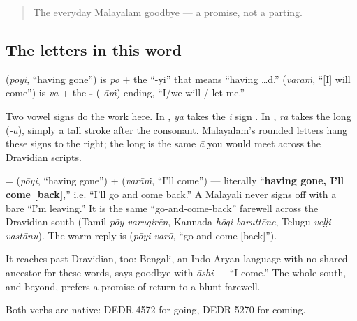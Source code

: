 \label{lesson:ML-C04-poyi-varaam}



\begin{quote}
The everyday Malayalam goodbye — a promise, not a parting.
\end{quote}

\subsection*{The letters in this word}
\textbf{} (\emph{pōyi}, \textquotedblleft{}having gone\textquotedblright{}) is \emph{pō} + the \textquotedblleft{}-yi\textquotedblright{} that means \textquotedblleft{}having …d.\textquotedblright{} \textbf{} (\emph{varāṁ}, \textquotedblleft{}{[}I{]} will come\textquotedblright{}) is \emph{va} + the \textbf{-} (\emph{-āṁ}) ending, \textquotedblleft{}I/we will / let me.\textquotedblright{}

Two vowel signs do the work here. In \textbf{}, \emph{ya} takes the \emph{i} sign \textbf{}. In \textbf{}, \emph{ra} takes the long \textbf{} (\emph{-ā}), simply a tall stroke after the consonant. Malayalam's rounded letters hang these signs to the right; the long \textbf{} is the same \emph{ā} you would meet across the Dravidian scripts.

\begin{cousinweb}
\textbf{ } = \textbf{} (\emph{pōyi}, \textquotedblleft{}having gone\textquotedblright{}) + \textbf{} (\emph{varāṁ}, \textquotedblleft{}I'll come\textquotedblright{}) — literally \textquotedblleft{}\textbf{having gone, I'll come {[}back{]}},\textquotedblright{} i.e. \textquotedblleft{}I'll go and come back.\textquotedblright{} A Malayali never signs off with a bare \textquotedblleft{}I'm leaving.\textquotedblright{} It is the same \textquotedblleft{}go-and-come-back\textquotedblright{} farewell across the Dravidian south (Tamil \emph{pōy varugiṟēṉ}, Kannada \emph{hōgi baruttēne}, Telugu \emph{veḷḷi vastānu}). The warm reply is \textbf{ } (\emph{pōyi varū}, \textquotedblleft{}go and come {[}back{]}\textquotedblright{}).

It reaches past Dravidian, too: Bengali, an Indo-Aryan language with no shared ancestor for these words, says goodbye with \emph{āshi} — \textquotedblleft{}I come.\textquotedblright{} The whole south, and beyond, prefers a promise of return to a blunt farewell.

Both verbs are native: DEDR 4572 for going, DEDR 5270 for coming.
\end{cousinweb}

